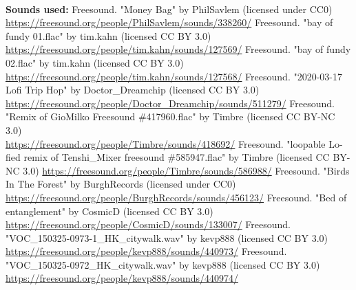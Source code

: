 \documentclass{article}
\begin{document}
\begin{thebibliography}{9}
        \textbf{\\ Sounds used:}
        Freesound. "Money Bag" by PhilSavlem (licensed under CC0) \\
        \url{https://freesound.org/people/PhilSavlem/sounds/338260/}
        Freesound. "bay of fundy 01.flac" by tim.kahn (licensed CC BY 3.0) \\
        \url{https://freesound.org/people/tim.kahn/sounds/127569/}
        Freesound. "bay of fundy 02.flac" by tim.kahn (licensed CC BY 3.0) \\
        \url{https://freesound.org/people/tim.kahn/sounds/127568/}
        Freesound. "2020-03-17 Lofi Trip Hop" by Doctor\_Dreamchip (licensed CC BY 3.0) \\
        \url{https://freesound.org/people/Doctor_Dreamchip/sounds/511279/}
        Freesound. "Remix of GioMilko Freesound \#417960.flac" by Timbre (licensed CC BY-NC 3.0) \\
        \url{https://freesound.org/people/Timbre/sounds/418692/}
        Freesound. "loopable Lo-fied remix of Tenshi\_Mixer freesound \#585947.flac" by Timbre (licensed CC BY-NC 3.0) \url{https://freesound.org/people/Timbre/sounds/586988/}
        Freesound. "Birds In The Forest" by BurghRecords (licensed under CC0) \\
        \url{https://freesound.org/people/BurghRecords/sounds/456123/}
        Freesound. "Bed of entanglement" by CosmicD (licensed CC BY 3.0) \\
        \url{https://freesound.org/people/CosmicD/sounds/133007/}
        Freesound. "VOC\_150325-0973-1\_HK\_citywalk.wav" by kevp888 (licensed CC BY 3.0) \\
        \url{https://freesound.org/people/kevp888/sounds/440973/}
        Freesound. "VOC\_150325-0972\_HK\_citywalk.wav" by kevp888 (licensed CC BY 3.0) \\
        \url{https://freesound.org/people/kevp888/sounds/440974/}

    \end{thebibliography}
    
    \newpage
\end{document}
